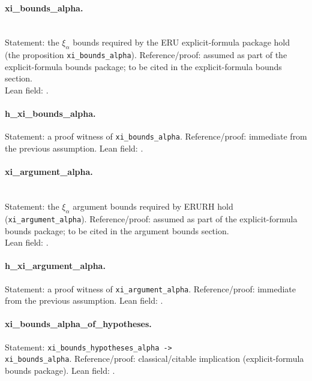 \paragraph{xi\_bounds\_alpha.}\leavevmode\\
Statement: the $\xi_\alpha$ bounds required by the ERU explicit-formula package
hold (the proposition \texttt{xi\_bounds\_alpha}).
Reference/proof: assumed as part of the explicit-formula bounds package;
to be cited in the explicit-formula bounds section.\\
Lean field: \allowbreak{}.

\paragraph{h\_xi\_bounds\_alpha.}
Statement: a proof witness of \texttt{xi\_bounds\_alpha}.
Reference/proof: immediate from the previous assumption. Lean field:
\allowbreak{}.

\paragraph{xi\_argument\_alpha.}\leavevmode\\
Statement: the $\xi_\alpha$ argument bounds required by ERURH hold
(\texttt{xi\_argument\_alpha}).
Reference/proof: assumed as part of the explicit-formula bounds package;
to be cited in the argument bounds section.\\
Lean field: \allowbreak{}.

\paragraph{h\_xi\_argument\_alpha.}
Statement: a proof witness of \texttt{xi\_argument\_alpha}.
Reference/proof: immediate from the previous assumption. Lean field:
\allowbreak{}.

\paragraph{xi\_bounds\_alpha\_of\_hypotheses.}
Statement: \texttt{xi\_bounds\_hypotheses\_alpha ->}\\
\texttt{xi\_bounds\_alpha}.
Reference/proof: classical/citable implication (explicit-formula bounds package).
Lean field: \allowbreak{}.

